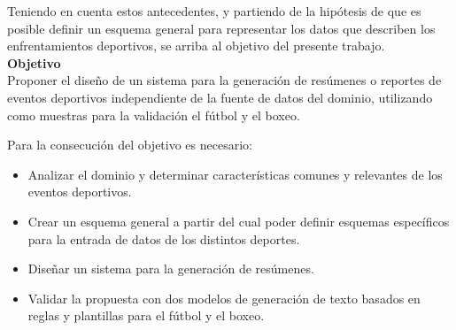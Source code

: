 Teniendo en cuenta estos antecedentes, y partiendo de la hipótesis de que es posible definir un esquema general para representar los datos que describen los enfrentamientos deportivos,
se arriba al objetivo del presente trabajo.\\



    \textbf{Objetivo}\\

    Proponer el diseño de un sistema para la generación de res\'umenes o reportes de eventos deportivos 
independiente de la fuente de datos del dominio, utilizando como muestras para la validación el fútbol y el boxeo.


    Para la consecución del objetivo es necesario:

    \begin{itemize}
        \item Analizar el dominio y determinar características comunes y relevantes de los eventos deportivos.
        \item Crear un esquema general a partir del cual poder definir esquemas específicos para la entrada de datos de los distintos deportes.
        \item Diseñar un sistema para la generación de resúmenes.
        \item Validar la propuesta con dos modelos de generación de texto basados en reglas y plantillas para el fútbol y el boxeo.   
    \end{itemize}

